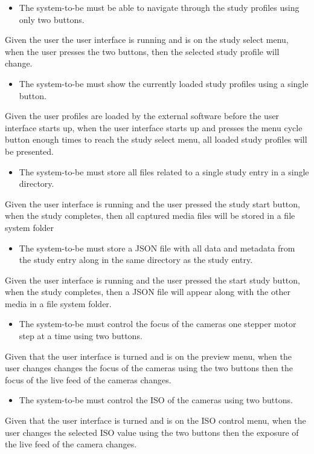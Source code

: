 \begin{itemize}
	\item The system-to-be must be able to navigate through the study profiles using only two buttons.
\end{itemize}
Given the user the user interface is running and is on the study select menu, when the user presses the two buttons, then the selected study profile will change.
\begin{itemize}
	\item The system-to-be must show the currently loaded study profiles using a single button.
\end{itemize}
Given the user profiles are loaded by the external software before the user interface starts up, when the user interface starts up and presses the menu cycle button enough times to reach the study select menu, all loaded study profiles will be presented.
\begin{itemize}
	\item The system-to-be must store all files related to a single study entry in a single directory.
\end{itemize}
Given the user interface is running and the user pressed the study start button, when the study completes, then all captured media files will be stored in a file system folder
\begin{itemize}
	\item The system-to-be must store a JSON file with all data and metadata from the study entry along in the same directory as the study entry.
\end{itemize}
Given the user interface is running and the user pressed the start study button, when the study completes, then a JSON file will appear along with the other media in a file system folder.
\begin{itemize}
	\item The system-to-be must control the focus of the cameras one stepper motor step at a time using two buttons.
\end{itemize}
Given that the user interface is turned and is on the preview menu, when the user changes changes the focus of the cameras using the two buttons then the focus of the live feed of the cameras changes.
\begin{itemize}
	\item The system-to-be must control the ISO of the cameras using two buttons.
\end{itemize}
Given that the user interface is turned and is on the ISO control menu, when the user changes the selected ISO value using the two buttons then the exposure of the live feed of the camera changes.
